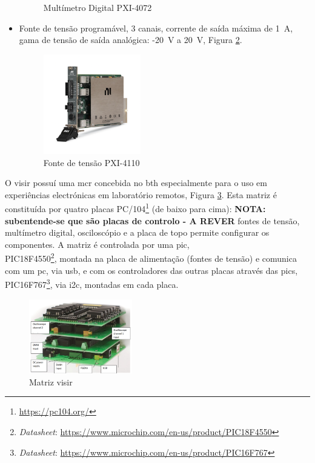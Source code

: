 \begin{itemize}
\begin{figure}[hbtp]
              \caption{Multímetro Digital PXI-4072 \cite{PXI-4072}}
              \label{fig:PXI-4072}
          \end{figure}
    \item Fonte de tensão programável, 3 canais, corrente de saída máxima de \SI{1}{\ampere}, gama de tensão de saída analógica: -\SI{20}{\volt} a \SI{20}{\volt}, Figura {\ref{fig:PXI-4110}}.
          \begin{figure}[hbtp]
              \centering
              \includegraphics[width=0.4\textwidth]{figures/PXI-4110.png}
              \caption{Fonte de tensão PXI-4110 \cite{PXI-4110}}
              \label{fig:PXI-4110}
          \end{figure}
\end{itemize}

O \acrshort{visir} possuí uma \acrfull{mcr} concebida no \acrshort{bth} especialmente para o uso em experiências electrónicas em \acrshort{laboratório remoto}s, Figura \ref{fig:matrizvisir}. Esta matriz é constituída por quatro placas PC/104\footnote{\url{https://pc104.org/}} (de baixo para cima): \textbf{NOTA: subentende-se que são placas de controlo - A REVER} fontes de tensão, multímetro digital, osciloscópio e a placa de topo permite configurar os componentes. A matriz é controlada por uma \acrfull{pic}, \\PIC18F4550\footnote{\textit{Datasheet}: \url{https://www.microchip.com/en-us/product/PIC18F4550}}, montada na placa de alimentação (fontes de tensão) e comunica com um \acrshort{pc}, via \acrshort{usb}, e com os controladores das outras placas através das \acrshort{pic}s, PIC16F767\footnote{\textit{Datasheet}: \url{https://www.microchip.com/en-us/product/PIC16F767}}, via \acrfull{i2c}, montadas em cada placa\cite{matriz}.

\begin{figure}[hbtp]
    \centering
    \includegraphics[width=0.4\textwidth]{figures/matriz.png}
    \caption{Matriz \acrshort{visir}\cite{matriz}}
    \label{fig:matrizvisir}
\end{figure}

